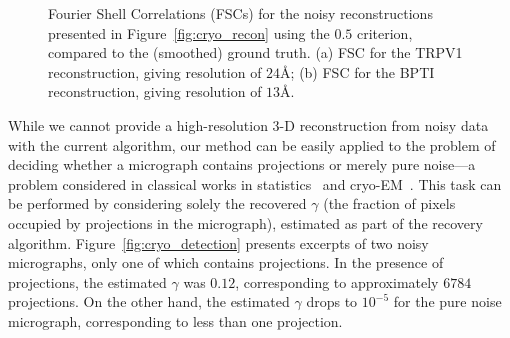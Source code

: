 \documentclass[12pt]{article}
\newcommand{\1}{\mathbf{1}}
\theoremstyle{plain}
\theoremstyle{definition}
\theoremstyle{remark}
\theoremstyle{plain}
\theoremstyle{remark}
\theoremstyle{plain}
\theoremstyle{plain}
\begin{document}
\begin{figure}[t!]
\begin{subfigure}[t]{0.4\textwidth}
		\caption{}
	\end{subfigure} 
	\caption{\label{fig:cryo_FSC}  {Fourier Shell Correlations (FSCs) for the noisy reconstructions presented in Figure~\ref{fig:cryo_recon} using the $0.5$ criterion, compared to the (smoothed) ground truth. (a) FSC for the TRPV1 reconstruction, giving resolution of $24$\AA; (b) FSC for the BPTI reconstruction, giving resolution of $13$\AA.}} 
\end{figure}


While we cannot provide a {high-resolution} 3-D reconstruction from noisy data with the current algorithm, our method can be easily applied to the problem of deciding whether a micrograph contains projections or merely pure noise---a problem considered in classical works in statistics~\cite{donoho2004higher} %
and cryo-EM~\cite{henderson2013avoiding}.
This task can be performed by considering solely the recovered $\gamma$ (the fraction of pixels occupied by projections in the micrograph), estimated as part of the recovery algorithm.
Figure~\ref{fig:cryo_detection} %
presents excerpts  of two noisy micrographs, only one of which contains projections.
In the presence of projections, the estimated $\gamma$ was $0.12$, corresponding to approximately $6784$ projections. 
On the other hand, the estimated $\gamma$ drops to $10^{-5}$ for the pure noise micrograph, corresponding to less than one projection.
\end{document}
